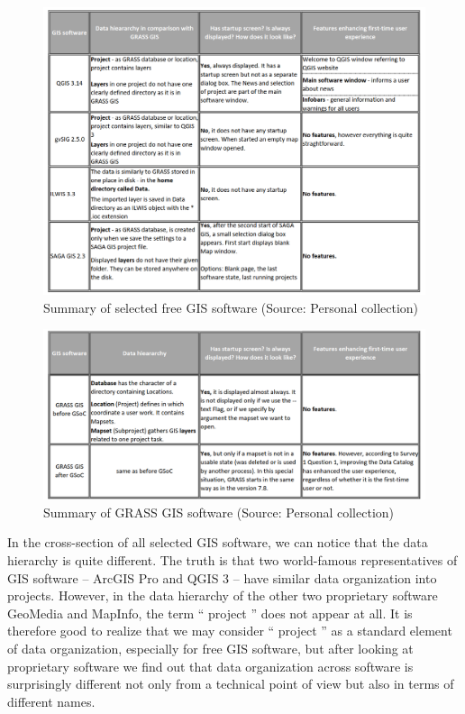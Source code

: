\documentclass[a4paper,10pt,twoside]{article}
\begin{document}
\vspace{0.3cm}
\begin{figure}[hbt!] 
\begin{center}
\includegraphics[width=16.5cm]{../pictures/open-source_software.png} 
\caption[Summary of selected free GIS software]{Summary of selected free GIS software (Source: Personal collection)}
\label{fig:open-source_software}
\end{center}
\end{figure}

\vspace{0.3cm}
\begin{figure}[hbt!] 
\begin{center}
\includegraphics[width=16.5cm]{../pictures/grass_gis_software.png} 
\caption[Summary of GRASS GIS software]{Summary of GRASS GIS software (Source: Personal collection)}
\label{fig:grass_gis_software}
\end{center}
\end{figure}

\noindent In the cross-section of all selected GIS software, we can
notice that the data hierarchy is quite different. The truth is that
two world-famous representatives of GIS software -- ArcGIS Pro and
QGIS 3 -- have similar data organization into projects. However, in
the data hierarchy of the other two proprietary software GeoMedia and
MapInfo, the term `` project '' does not appear at all. It is
therefore good to realize that we may consider `` project '' as a
standard element of data organization, especially for free GIS
software, but after looking at proprietary software we find out that
data organization across software is surprisingly different not only
from a technical point of view but also in terms of different names.
\end{document}
